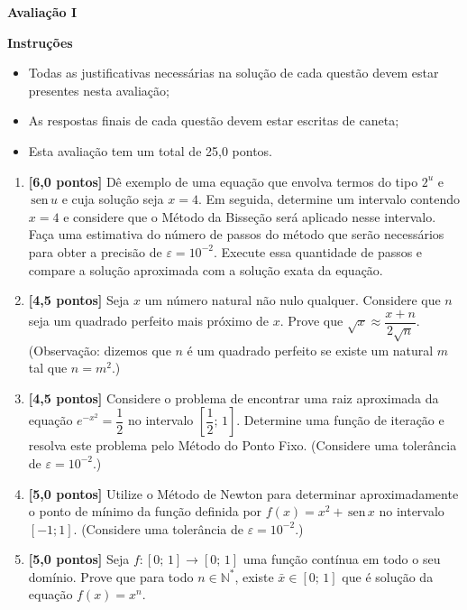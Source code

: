 \documentclass[12pt,a4paper]{article}
\newcommand{\sen}{\,\textrm{sen}\,}
\begin{document}
\begin{center}
 \textbf{Avaliação I}
\end{center}

\textbf{Instruções}
\begin{itemize}
 \item Todas as justificativas necessárias na solução de cada questão devem estar presentes nesta avaliação;
 \item As respostas finais de cada questão devem estar escritas de caneta;
 \item Esta avaliação tem um total de 25,0 pontos.
\end{itemize}

\begin{enumerate}
 \item \textbf{[6,0 pontos]} Dê exemplo de uma equação que envolva termos do tipo $2^u$ e $\sen u$ e cuja solução seja $x = 4$. Em seguida, determine um intervalo 
contendo $x = 4$ e considere que o Método da Bisseção será aplicado nesse intervalo. Faça uma estimativa do número de passos do método que 
serão necessários para obter a precisão de $\varepsilon = 10^{-2}$. Execute essa quantidade de passos e compare a solução aproximada com a solução 
exata da equação.
 \item \textbf{[4,5 pontos]} Seja $x$ um número natural não nulo qualquer. Considere que $n$ seja um quadrado perfeito mais próximo de $x$. Prove que $\sqrt{x}\approx \dfrac{x+n}{2\sqrt{n}}$. 
 (Observação: dizemos que $n$ é um quadrado perfeito se existe um natural $m$ tal que $n = m^2$.)
 
 \item \textbf{[4,5 pontos]} Considere o problema de encontrar uma raiz aproximada da equação $e^{-x^2} = \dfrac{1}{2}$ no intervalo $\left[\dfrac{1}{2};\,1\right]$. Determine uma função de iteração e resolva este problema pelo Método do Ponto Fixo. 
 (Considere uma tolerância de $\varepsilon = 10^{-2}$.)

 \item \textbf{[5,0 pontos]} Utilize o Método de Newton para determinar aproximadamente o ponto de mínimo da função definida por $f(x) = x^2 + \sen x$ no intervalo $[-1; 1]$. (Considere uma tolerância de $\varepsilon = 10^{-2}$.)

 \item \textbf{[5,0 pontos]} Seja $f:[0;\, 1]\to [0;\,1]$ uma função contínua em todo o seu domínio. Prove que para todo $n\in\mathbb{N}^*$, existe $\bar{x}\in[0;\,1]$ que é 
 solução da equação $f(x) = x^n$.

\end{enumerate}
\end{document}
